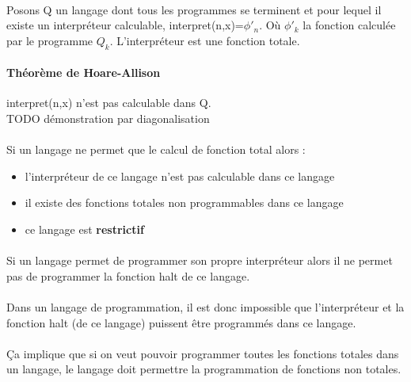 \documentclass[11pt,a4paper]{article}
\begin{document}
\paragraph{} Posons Q un langage dont tous les programmes se terminent et pour 
lequel il existe un interpréteur calculable, interpret(n,x)=$\phi'_n$. Où
$\phi'_k$ la fonction calculée par le programme $Q_k$. L'interpréteur est une 
fonction totale.

\paragraph{Théorème de Hoare-Allison}
\label{par:th_or_me_de_hoare_allison}
interpret(n,x) n'est pas calculable dans Q.\\

TODO démonstration par diagonalisation


\paragraph{}
Si un langage ne permet que le calcul de fonction total alors :
\begin{itemize}
	\item l'interpréteur de ce langage n'est pas calculable dans ce langage
	\item il existe des fonctions totales non programmables dans ce langage
	\item ce langage est \bf{restrictif}
\end{itemize}

\paragraph{} Si un langage permet de programmer son propre interpréteur alors il ne permet 
pas de programmer la fonction halt de ce langage.

\paragraph{} Dans un langage de programmation, il est donc impossible que 
l'interpréteur et la fonction halt (de ce langage) puissent être programmés dans ce langage.

\paragraph{} Ça implique que si on veut pouvoir programmer toutes les fonctions 
totales dans un langage, le langage doit permettre la programmation de 
fonctions non totales.
\end{document}
